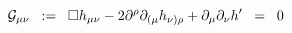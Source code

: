 \begin{equation}
{\cal{G}}_{\mu\nu} \;\; :=\;\; \square h_{\mu\nu} - 2 \partial^{\rho} 
\partial_{( \mu} h_{\nu ) \rho} + \partial_{\mu} \partial_{\nu} 
h^{\prime} \;\; =\;\; 0
\label{eq:a2}
\end{equation}

